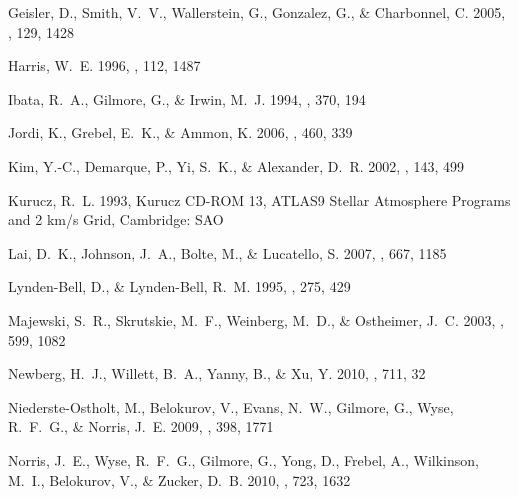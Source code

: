 \documentclass[manuscript]{aastex}
\begin{document}
\begin{thebibliography}{40}
{Geisler}, D., {Smith}, V.~V., {Wallerstein}, G., {Gonzalez}, G., \&
  {Charbonnel}, C. 2005, \aj, 129, 1428

{Harris}, W.~E. 1996, \aj, 112, 1487

{Ibata}, R.~A., {Gilmore}, G., \& {Irwin}, M.~J. 1994, \nat, 370, 194

{Jordi}, K., {Grebel}, E.~K., \& {Ammon}, K. 2006, \aap, 460, 339

{Kim}, Y.-C., {Demarque}, P., {Yi}, S.~K., \& {Alexander}, D.~R. 2002, \apjs,
  143, 499

{Kurucz}, R.~L. 1993, {Kurucz CD-ROM 13, ATLAS9 Stellar Atmosphere Programs and
  2 km/s Grid}, Cambridge: SAO

{Lai}, D.~K., {Johnson}, J.~A., {Bolte}, M., \& {Lucatello}, S. 2007, \apj,
  667, 1185

{Lynden-Bell}, D., \& {Lynden-Bell}, R.~M. 1995, \mnras, 275, 429

{Majewski}, S.~R., {Skrutskie}, M.~F., {Weinberg}, M.~D., \& {Ostheimer}, J.~C.
  2003, \apj, 599, 1082

{Newberg}, H.~J., {Willett}, B.~A., {Yanny}, B., \& {Xu}, Y. 2010, \apj, 711,
  32

{Niederste-Ostholt}, M., {Belokurov}, V., {Evans}, N.~W., {Gilmore}, G.,
  {Wyse}, R.~F.~G., \& {Norris}, J.~E. 2009, \mnras, 398, 1771

{Norris}, J.~E., {Wyse}, R.~F.~G., {Gilmore}, G., {Yong}, D., {Frebel}, A.,
  {Wilkinson}, M.~I., {Belokurov}, V., \& {Zucker}, D.~B. 2010, \apj, 723, 1632


\end{thebibliography}
\end{document}
